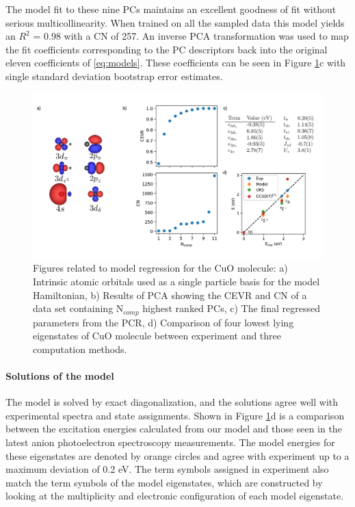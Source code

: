 \documentclass[12pt]{article}
\begin{document}
The model fit to these nine PCs maintains an excellent goodness of fit without serious multicollinearity.
When trained on all the sampled data this model yields an $R^2$ = 0.98 with a CN of 257. 
An inverse PCA transformation was used to map the fit coefficients corresponding to the PC descriptors back into the original eleven coefficients of \eqref{eq:models}.
These coefficients can be seen in Figure \ref{fig:cuo_regr}c with single standard deviation bootstrap error estimates.

\begin{figure}
\centering
\hspace*{-0.25in}
\includegraphics[width=1.1\linewidth]{./figs/cuo_regr_2.pdf}
\caption{Figures related to model regression for the CuO molecule: a) Intrinsic atomic orbitals used as a single particle basis for the model Hamiltonian, b) Results of PCA showing the CEVR and CN of a data set containing N$_{comp}$  highest ranked PCs, c) The final regressed parameters from the PCR, d) Comparison of four lowest lying eigenstates of CuO molecule between experiment and three computation methods.}
\label{fig:cuo_regr}
\end{figure}

\paragraph{Solutions of the model}
The model is solved by exact diagonalization, and the solutions agree well with experimental spectra and state assignments.
Shown in Figure \ref{fig:cuo_regr}d is a comparison between the excitation energies calculated from our model and those seen in the latest anion photoelectron spectroscopy measurements.
The model energies for these eigenstates are denoted by orange circles and agree with experiment up to a maximum deviation of 0.2 eV.
The term symbols assigned in experiment also match the term symbols of the model eigenstates, which are constructed by looking at the multiplicity and electronic configuration of each model eigenstate. 
\end{document}
